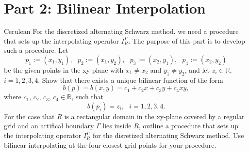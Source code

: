 \documentclass[12pt]{article}
\def\R{\mathbb{R}}
\begin{document}
\section{Part 2: Bilinear Interpolation} \begin{mybox}{Cerulean}{}
For the discretized alternating Schwarz method, we need a procedure that sets up the interpolating operator $I_R^\Gamma$.  The purpose of this part is to develop such a procedure.  Let
$$p_1:=(x_1,y_1), \text{ } p_2:=(x_1,y_2), \text{ } p_3:=(x_2,y_1), \text{ } p_4:=(x_2,y_2)$$
be the given points in the xy-plane with $x_1 \neq x_2$ and $y_1 \neq y_2$, and let $z_i \in \R$, $i = 1,2,3,4$.  Show that there exists a unique bilinear function of the form
$$b(p) = b(x,y) = c_1 + c_2x + c_3y + c_4xy,$$
where $c_1$, $c_2$, $c_3$, $c_4 \in \R$, such that
$$b(p_i) = z_i, \text{ } i = 1,2,3,4.$$
For the case that $R$ is a rectangular domain in the xy-plane covered by a regular grid and an artifical boundary $\Gamma$ lies inside $R$, outline a procedure that sets up the interpolating operator $I_R^\Gamma$ for the disretized alternating Schwarz method.  Use bilinear interpolating at the four closest grid points for your procedure.
\end{mybox}\text{ }\\
\end{document}
